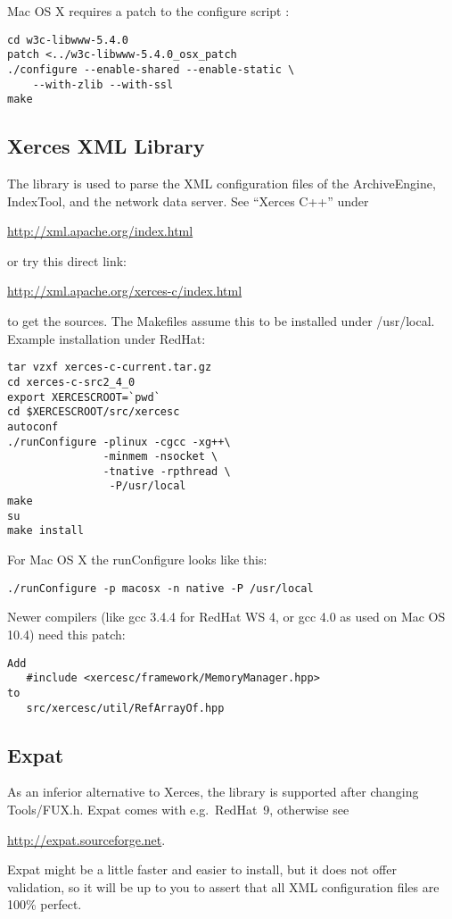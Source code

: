 \noindent Mac OS X requires a patch to the configure script \cite{darwinports}:
\begin{lstlisting}[keywordstyle=\sffamily]
cd w3c-libwww-5.4.0
patch <../w3c-libwww-5.4.0_osx_patch
./configure --enable-shared --enable-static \
    --with-zlib --with-ssl
make
\end{lstlisting}

\subsection{Xerces XML Library}
The  library is used to parse the XML configuration files of the
ArchiveEngine, IndexTool, and the network data server.
See ``Xerces C++'' under
\begin{center}
\href{http://xml.apache.org/index.html}{http://xml.apache.org/index.html}
\end{center}
or try this direct link:
\begin{center}
\href{http://xml.apache.org/xerces-c/index.html}
     {http://xml.apache.org/xerces-c/index.html}
\end{center}
to get the sources. The Makefiles assume this to be installed under /usr/local.
Example installation under RedHat:
\begin{lstlisting}[keywordstyle=\sffamily]
tar vzxf xerces-c-current.tar.gz 
cd xerces-c-src2_4_0
export XERCESCROOT=`pwd`
cd $XERCESCROOT/src/xercesc
autoconf
./runConfigure -plinux -cgcc -xg++\
               -minmem -nsocket \
               -tnative -rpthread \
                -P/usr/local
make
su
make install
\end{lstlisting}

\noindent For Mac OS X the runConfigure looks like this:
\begin{lstlisting}[keywordstyle=\sffamily]
./runConfigure -p macosx -n native -P /usr/local
\end{lstlisting}

\noindent Newer compilers (like gcc 3.4.4 for RedHat WS 4,
 or gcc 4.0 as used on Mac OS 10.4)
need this patch:
\begin{lstlisting}[keywordstyle=\sffamily]
Add
   #include <xercesc/framework/MemoryManager.hpp>
to
   src/xercesc/util/RefArrayOf.hpp
\end{lstlisting}


\subsection{Expat}
As an inferior alternative to Xerces, the  library is supported
after changing Tools/FUX.h. Expat comes with e.g.\ RedHat~9,
otherwise see
\begin{center}
\href{http://expat.sourceforge.net}{http://expat.sourceforge.net}.
\end{center}
Expat might be a little faster and easier to install, but it does not
offer validation, so it will be up to you to assert that all XML
configuration files are 100\% perfect.

